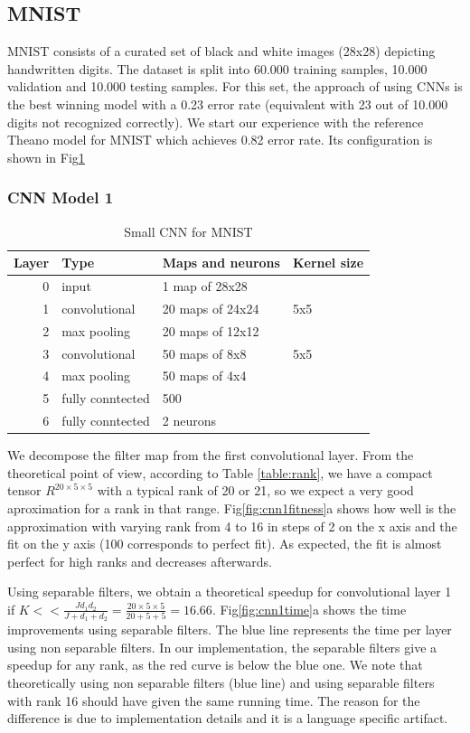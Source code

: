 
\subsection{MNIST}
MNIST consists of a curated set of black and white images (28x28) depicting handwritten digits.
The dataset is split into 60.000 training samples, 10.000 validation and 
10.000 testing samples. For this set, the approach of \cite{DBLP:journals/corr/abs-1202-2745} using CNNs is the best winning model with a 0.23 error rate (equivalent with 23 out of 10.000 digits not recognized correctly).
We start our experience with the reference Theano model for MNIST which achieves 0.82 error rate. Its configuration is shown in Fig\ref{fig:cnn1}
\subsubsection{CNN Model 1}
\begin{table}
\centering
\begin{tabular}{@{}rlll@{}}\toprule
Layer & Type & Maps and neurons& Kernel size \\ \midrule
0 & input & 1 map of 28x28 &\\
1& convolutional & 20 maps of 24x24 & 5x5\\
2 & max pooling & 20 maps of 12x12 &  \\
3 & convolutional & 50 maps of 8x8& 5x5 \\
4 & max pooling & 50 maps of 4x4&  \\ 
5 & fully conntected& 500 & \\
6 & fully conntected & 2 neurons & \\ \bottomrule
\end{tabular}
\caption{Small CNN for MNIST}
\label{fig:cnn1}
\end{table}

We decompose the filter map from the first convolutional layer. From the theoretical point of view, according to Table \ref{table:rank}, we have a compact tensor $R^{20\times 5 \times 5}$ with a typical rank of 20 or 21, so we expect a very good aproximation for a rank in that range. 
Fig\ref{fig:cnn1fitness}a shows how well is the approximation with varying rank from 4 to 16 in steps of 2 on the x axis and the fit on the y axis (100 corresponds to perfect fit). As expected, the fit is almost perfect for high ranks and decreases afterwards.

Using separable filters, we obtain a theoretical speedup for convolutional layer 1 if $K<< \frac{Jd_{1}d_{2}}{J +d_{1}+d_{2}} = \frac{20\times 5\times 5}{20 + 5 + 5} = 16.66$. Fig\ref{fig:cnn1time}a shows the time improvements using separable filters. The blue line represents the time per layer using non separable filters. In our implementation, the separable filters give a speedup for any rank, as the red curve is below the blue one. 
We note that theoretically using non separable filters (blue line) and using separable filters with rank 16 should have given the same running time. The reason for the difference is due to implementation details and it is a language specific artifact.

